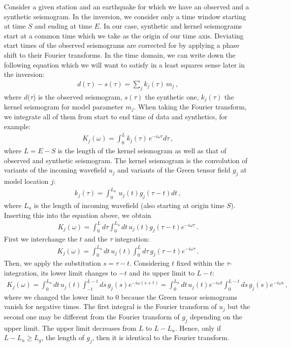  Consider a given station and an earthquake for which we have an observed and a synthetic seismogram. In the inversion, we consider only a time window starting at time $S$ and ending at time $E$. In our case, synthetic and kernel seismograms start at a common time which we take as the origin of our time axis. Deviating start times of the observed seismograms are corrected for by applying a phase shift to their Fourier transforms. In the time domain, we can write down the following equation which we will want to satisfy in a least squares sense later in the inversion:
\begin{align}
	d(\tau) - s(\tau) = \sum_j k_j(\tau)\,m_j \,,
\end{align}
%
where $d(\tau$) is the observed seismogram, $s(\tau)$ the synthetic one, $k_j(\tau)$ the kernel seismogram for model parameter $m_j$. When taking the Fourier transform, we integrate all of them from start to end time of data and synthetics, for example:
%
\begin{align}
	K_j(\omega) = \int_0^{L} k_j(\tau)\,e^{-i\omega\tau}d\tau\,,
\end{align}
% 
where $L = E-S$ is the length of the kernel seismogram as well as that of observed and synthetic seismogram. The kernel seismogram is the convolution of variants of the incoming wavefield $u_j$ and variants of the Green tensor field $g_j$ at model location $j$:
%
\begin{align}
	k_j(\tau) = \int_0^{L_u}\,u_j(t)g_j(\tau-t)dt \,,
\end{align}
%
where $L_u$ is the length of incoming wavefield (also starting at origin time $S$). Inserting this into the equation above, we obtain
%
\begin{align}
	K_j(\omega) = \int_0^{L}d\tau\int_0^{L_u}dt\,u_j(t)g_j(\tau-t)e^{-i\omega\tau} \,.
\end{align}
% 
First we interchange the $t$ and the $\tau$ integration:
%
\begin{align}
	K_j(\omega) = \int_0^{L_u}dt\,u_j(t)\int_0^{L}d\tau\,g_j(\tau-t)e^{-i\omega\tau} \,.
\end{align}
% 
Then, we apply the substitution $s=\tau-t$. Considering $t$ fixed within the $\tau$-integration, its lower limit changes to $-t$ and its upper limit to $L-t$:
%
\begin{align}
	K_j(\omega) = \int_0^{L_u}dt\,u_j(t)\int_{-t}^{L-t}ds\,g_j(s)e^{-i\omega(s+t)} =
	 \int_0^{L_u}dt\,u_j(t)e^{-i\omega t}\int_{0}^{L-t}ds\,g_j(s)e^{-i\omega s}\,,
\end{align}
% 
where we changed the lower limit to $0$ because the Green tensor seismograms vanish for negative times. The first integral is the Fourier transform of $u_j$ but the second one may be different from the Fourier transform of $g_j$ depending on the upper limit. The upper limit decreases from $L$ to $L-L_u$. Hence, only if $L-L_u \ge L_g$, the length of $g_j$, then it is identical to the Fourier transform.

